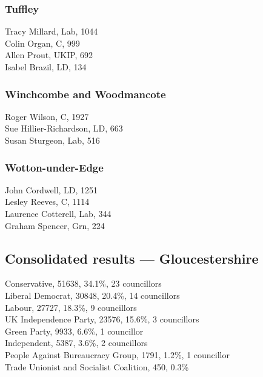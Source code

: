 \documentclass[a4paper,openany,10pt]{book}
\begin{document}
\subsubsection*{Tuffley}



Tracy Millard, Lab, 1044\\
Colin Organ, C, 999\\
Allen Prout, UKIP, 692\\
Isabel Brazil, LD, 134\\


\subsubsection*{Winchcombe and Woodmancote}



Roger Wilson, C, 1927\\
Sue Hillier-Richardson, LD, 663\\
Susan Sturgeon, Lab, 516\\


\subsubsection*{Wotton-under-Edge}



John Cordwell, LD, 1251\\
Lesley Reeves, C, 1114\\
Laurence Cotterell, Lab, 344\\
Graham Spencer, Grn, 224\\




\subsection*{Consolidated results --- Gloucestershire}
Conservative, 51638, 34.1\%, 23 councillors\\
Liberal Democrat, 30848, 20.4\%, 14 councillors\\
Labour, 27727, 18.3\%, 9 councillors\\
UK Independence Party, 23576, 15.6\%, 3 councillors\\
Green Party, 9933, 6.6\%, 1 councillor\\
Independent, 5387, 3.6\%, 2 councillors\\
People Against Bureaucracy Group, 1791, 1.2\%, 1 councillor\\
Trade Unionist and Socialist Coalition, 450, 0.3\% \\
\end{document}
